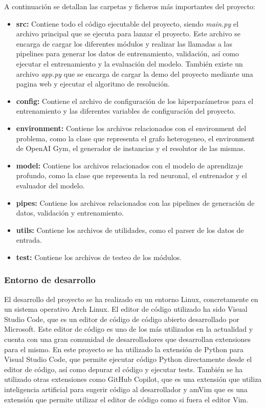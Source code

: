 A continuación se detallan las carpetas y ficheros más importantes del proyecto:
\begin{itemize}
    \item \textbf{src: } Contiene todo el código ejecutable del proyecto, siendo \textit{main.py} el archivo 
    principal que se ejecuta para lanzar el proyecto. Este archivo se encarga de cargar los
    diferentes módulos y realizar las llamadas a las pipelines para generar los datos de entrenamiento,
    validación, así como ejecutar el entrenamiento y la evaluación del modelo. También existe un archivo
    \textit{app.py} que se encarga de cargar la demo del proyecto mediante una pagina web y ejecutar el 
    algoritmo de resolución.
    \item \textbf{config: } Contiene el archivo de configuración de los hiperparámetros para el entrenamiento 
    y las diferentes variables de configuración del proyecto.
    \item \textbf{environment: } Contiene los archivos relacionados con el environment del problema, como la
    clase que representa el grafo heterogeneo, el environment de OpenAI Gym, el generador de instancias y 
    el resolutor de las mismas.
    \item \textbf{model: } Contiene los archivos relacionados con el modelo de aprendizaje profundo, como la
    clase que representa la red neuronal, el entrenador y el evaluador del modelo.
    \item \textbf{pipes: } Contiene los archivos relacionados con las pipelines de generación de datos,
    validación y entrenamiento. 
    \item \textbf{utils: } Contiene los archivos de utilidades, como el parser de los datos de entrada.
    \item \textbf{test: } Contiene los archivos de testeo de los módulos.
\end{itemize}

\subsubsection{Entorno de desarrollo}
El desarrollo del proyecto se ha realizado en un entorno Linux, concretamente en un sistema operativo
Arch Linux. El editor de código utilizado ha sido Visual Studio Code, que es un editor de código
de código abierto desarrollado por Microsoft. Este editor de código es uno de los más utilizados
en la actualidad y cuenta con una gran comunidad de desarrolladores que desarrollan extensiones
para el mismo. En este proyecto se ha utilizado la extensión de Python para Visual Studio Code,
que permite ejecutar código Python directamente desde el editor de código, así como depurar el
código y ejecutar tests. También se ha utilizado otras extensiones como GitHub Copilot, que es
una extensión que utiliza inteligencia artificial para sugerir código al desarrollador y amVim
que es una extensión que permite utilizar el editor de código como si fuera el editor Vim.

